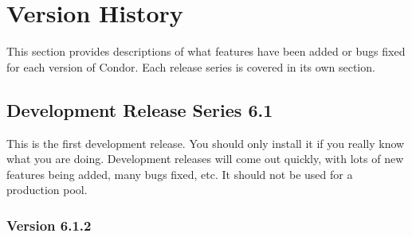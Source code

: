 \section{\label{sec:Version-History}Version History}

This section provides descriptions of what features have been added or
bugs fixed for each version of Condor.  
Each release series is covered in its own section.

\subsection{\label{sec:History-6-1}Development Release Series 6.1}

This is the first development release.
You should only install it if you really know what you are doing.
Development releases will come out quickly, with lots of new features
being added, many bugs fixed, etc.  
It should not be used for a production pool.

\subsubsection{\label{sec:New-6-1-1}Version 6.1.2}

